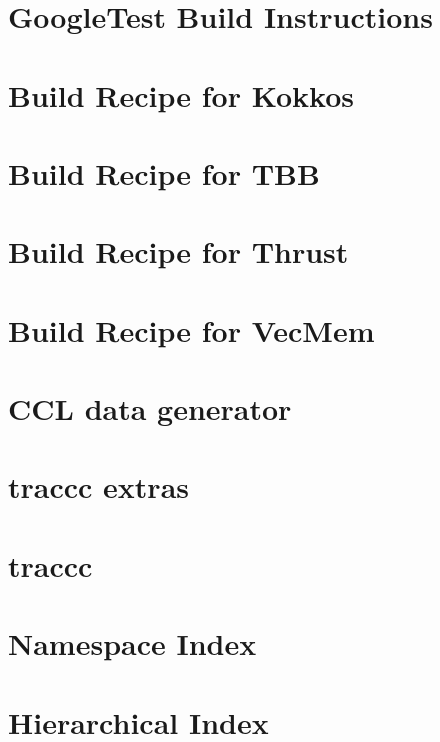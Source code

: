 \let\mypdfximage\pdfximage\def\pdfximage{\immediate\mypdfximage}\documentclass[twoside]{book}
\newcommand{\+}{\discretionary{\mbox{\scriptsize$\hookleftarrow$}}{}{}}
\begin{document}
\chapter{Google\+Test Build Instructions}
\label{md_extern_googletest_README}

\chapter{Build Recipe for Kokkos}
\label{md_extern_kokkos_README}

\chapter{Build Recipe for T\+BB}
\label{md_extern_tbb_README}

\chapter{Build Recipe for Thrust}
\label{md_extern_thrust_README}

\chapter{Build Recipe for Vec\+Mem}
\label{md_extern_vecmem_README}

\chapter{C\+CL data generator}
\label{md_extras_ccl_generator_README}

\chapter{traccc extras}
\label{md_extras_README}

\chapter{traccc}
\label{md_README}

\chapter{Namespace Index}

\chapter{Hierarchical Index}

\end{document}
